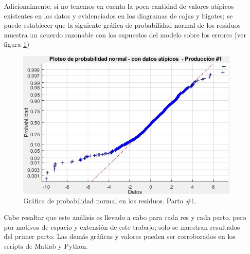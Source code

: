 Adicionalmente, si no tenemos en cuenta la poca cantidad de valores atípicos existentes en los datos y evidenciados en los diagramas de cajas y bigotes; se puede establecer que la siguiente gráfica de probabilidad normal de los residuos muestra un acuerdo razonable con los supuestos del modelo sobre los errores (ver figura \ref{residprobnormpng})

\begin{figure}[H]
	 \begin{center}
	 \includegraphics[scale=0.7]{img/residprobnormspa.jpg}
	 \end{center}
	 \caption{Gráfica de probabilidad normal en los residuos. Parto \#1. \label{residprobnormpng}}
\end{figure}

Cabe resaltar que este análisis es llevado a cabo para cada res y cada parto, pero por motivos de espacio y extensión de este trabajo; solo se muestran resultados del primer parto. Las demás gráficas y valores pueden ser corroborados en los scripts de Matlab y Python.

